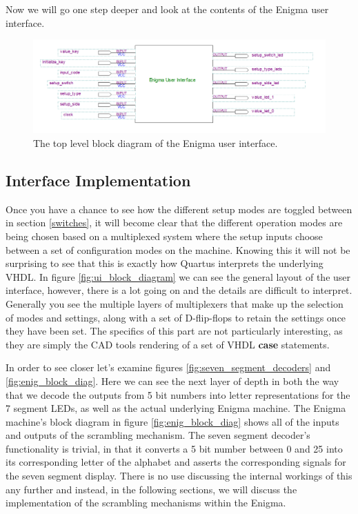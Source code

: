 \documentclass{article}
\begin{document}
Now we will go one step deeper and look at the contents of the Enigma user interface. 

\begin{figure}[ht!]
    \centering
    \includegraphics[scale=0.3]{full_sys_block_diag.PNG}
    \caption{The top level block diagram of the Enigma user interface.}
    \label{fig:full_sys_block_diag}
\end{figure}

\subsection{Interface Implementation}
Once you have a chance to see how the different setup modes are toggled between in section \ref{switches}, it will become clear that the different operation modes are being chosen based on a multiplexed system where the setup inputs choose between a set of configuration modes on the machine. Knowing this it will not be surprising to see that this is exactly how Quartus interprets the underlying VHDL. In figure \ref{fig:ui_block_diagram} we can see the general layout of the user interface, however, there is a lot going on and the details are difficult to interpret. Generally you see the multiple layers of multiplexers that make up the selection of modes and settings, along with a set of D-flip-flops to retain the settings once they have been set. The specifics of this part are not particularly interesting, as they are simply the CAD tools rendering of a set of VHDL \textbf{case} statements. 

In order to see closer let's examine figures \ref{fig:seven_segment_decoders} and \ref{fig:enig_block_diag}. Here we can see the next layer of depth in both the way that we decode the outputs from 5 bit numbers into letter representations for the 7 segment LEDs, as well as the actual underlying Enigma machine. The Enigma machine's block diagram in figure \ref{fig:enig_block_diag} shows all of the inputs and outputs of the scrambling mechanism. The seven segment decoder's functionality is trivial, in that it converts a 5 bit number between 0 and 25 into its corresponding letter of the alphabet and asserts the corresponding signals for the seven segment display. There is no use discussing the internal workings of this any further and instead, in the following sections, we will discuss the implementation of the scrambling mechanisms within the Enigma. 
\end{document}
